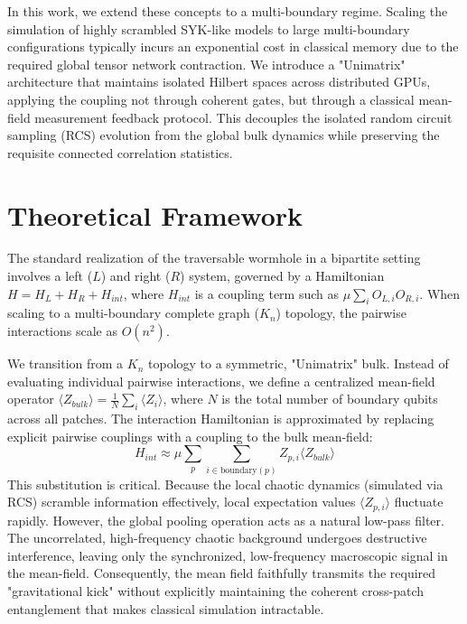 \documentclass[11pt,a4paper]{article}
\begin{document}
In this work, we extend these concepts to a multi-boundary regime. Scaling the simulation of highly scrambled SYK-like models to large multi-boundary configurations typically incurs an exponential cost in classical memory due to the required global tensor network contraction. We introduce a "Unimatrix" architecture that maintains isolated Hilbert spaces across distributed GPUs, applying the coupling not through coherent gates, but through a classical mean-field measurement feedback protocol. This decouples the isolated random circuit sampling (RCS) evolution from the global bulk dynamics while preserving the requisite connected correlation statistics.

\section{Theoretical Framework}
The standard realization of the traversable wormhole in a bipartite setting involves a left ($L$) and right ($R$) system, governed by a Hamiltonian $H = H_L + H_R + H_{int}$, where $H_{int}$ is a coupling term such as $\mu \sum_i O_{L,i} O_{R,i}$. When scaling to a multi-boundary complete graph ($K_n$) topology, the pairwise interactions scale as $O(n^2)$.

We transition from a $K_n$ topology to a symmetric, "Unimatrix" bulk. Instead of evaluating individual pairwise interactions, we define a centralized mean-field operator $\langle Z_{bulk} \rangle = \frac{1}{N} \sum_{i} \langle Z_i \rangle$, where $N$ is the total number of boundary qubits across all patches. The interaction Hamiltonian is approximated by replacing explicit pairwise couplings with a coupling to the bulk mean-field:
\begin{equation}
    H_{int} \approx \mu \sum_{p} \sum_{i \in \text{boundary}(p)} Z_{p,i} \langle Z_{bulk} \rangle
\end{equation}
This substitution is critical. Because the local chaotic dynamics (simulated via RCS) scramble information effectively, local expectation values $\langle Z_{p,i} \rangle$ fluctuate rapidly. However, the global pooling operation acts as a natural low-pass filter. The uncorrelated, high-frequency chaotic background undergoes destructive interference, leaving only the synchronized, low-frequency macroscopic signal in the mean-field. Consequently, the mean field faithfully transmits the required "gravitational kick" without explicitly maintaining the coherent cross-patch entanglement that makes classical simulation intractable.
\end{document}
